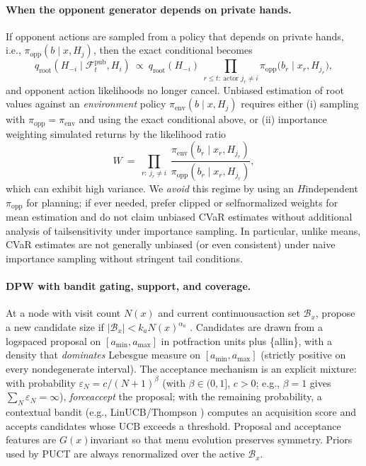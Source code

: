 \documentclass[10pt]{article}
\newcommand{\1}{\mathbf{1}}
\theoremstyle{plain}
\begin{document}
\paragraph{When the opponent generator depends on private hands.}
If opponent actions are sampled from a policy that depends on private hands, i.e., $\pi_{\mathrm{opp}}(b\mid x,H_{j})$, then the exact conditional becomes
\[
q_{\mathrm{root}}(H_{-i}\mid \mathcal{F}^{\mathrm{pub}}_t, H_i)\ \propto\ q_{\mathrm{root}}(H_{-i})\ \prod_{r\le t:\ \text{actor }j_r\neq i} \pi_{\mathrm{opp}}\!\big(b_r\mid x_r, H_{j_r}\big),
\]
and opponent action likelihoods no longer cancel. Unbiased estimation of root values against an \emph{environment} policy $\pi_{\mathrm{env}}(b\mid x,H_j)$ requires either (i) sampling with $\pi_{\mathrm{opp}}=\pi_{\mathrm{env}}$ and using the exact conditional above, or (ii) importance weighting simulated returns by the likelihood ratio
\[
W\ =\ \prod_{r:\ j_r\neq i}\ \frac{\pi_{\mathrm{env}}(b_r\mid x_r, H_{j_r})}{\pi_{\mathrm{opp}}(b_r\mid x_r, H_{j_r})},
\]
which can exhibit high variance. We \emph{avoid} this regime by using an $H$\textendash independent $\pi_{\mathrm{opp}}$ for planning; if ever needed, prefer clipped or self\textendash normalized weights for mean estimation and do not claim unbiased CVaR estimates without additional analysis of tail\textendash sensitivity under importance sampling. In particular, unlike means, CVaR estimates are not generally unbiased (or even consistent) under naive importance sampling without stringent tail conditions.

\paragraph{DPW with bandit gating, support, and coverage.}
At a node with visit count $N(x)$ and current continuous\textendash action set $\mathcal{B}_x$, propose a new candidate size if $|\mathcal{B}_x|<k_a N(x)^{\alpha_a}$ \citep{couetoux2011dpw}. Candidates are drawn from a log\textendash spaced proposal on $[a_{\min},a_{\max}]$ in pot\textendash fraction units plus \{all\textendash in\}, with a density that \emph{dominates} Lebesgue measure on $[a_{\min},a_{\max}]$ (strictly positive on every nondegenerate interval). The acceptance mechanism is an explicit mixture: with probability $\varepsilon_N=c/(N+1)^\beta$ (with $\beta\in(0,1]$, $c>0$; e.g., $\beta=1$ gives $\sum_N \varepsilon_N=\infty$), \emph{force\textendash accept} the proposal; with the remaining probability, a contextual bandit (e.g., LinUCB/Thompson \citep{li2010linucb}) computes an acquisition score and accepts candidates whose UCB exceeds a threshold. Proposal and acceptance features are $G(x)$\textendash invariant so that menu evolution preserves symmetry. Priors used by PUCT are always renormalized over the active $\mathcal{B}_x$.
\end{document}
